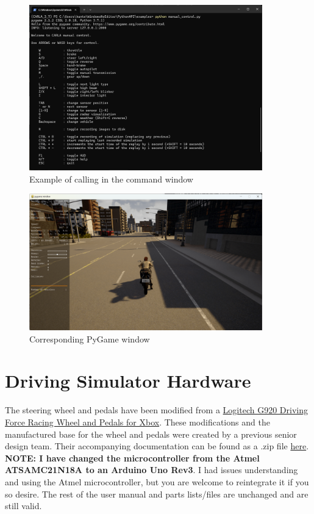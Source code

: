 \documentclass[12pt,oneside,letterpaper]{article}
\begin{document}
\begin{figure}[h]
\centering
\includegraphics[width=0.9\textwidth]{manual_control_cmd}
\caption{Example of calling  in the command window}
\label{fig:manual_control_cmd}
\end{figure}

\begin{figure}[h]
\centering
\includegraphics[width=0.9\textwidth]{manual_control_example}
\caption{Corresponding  PyGame window}
\label{fig:manual_control_example}
\end{figure}

\section{Driving Simulator Hardware}
The steering wheel and pedals have been modified from a \href{https://www.logitechg.com/en-sa/products/driving/driving-force-racing-wheel.941-000123.html}{Logitech G920 Driving Force Racing Wheel and Pedals for Xbox}.  These modifications and the manufactured base for the wheel and pedals were created by a previous senior design team. Their accompanying documentation can be found as a .zip file \href{https://alabama.box.com/s/ppm0j7ax0zvq7z98z6g3qv7kapbet37a}{here}. \textbf{NOTE: I have changed the microcontroller from the Atmel ATSAMC21N18A to an Arduino Uno Rev3}. I had issues understanding and using the Atmel microcontroller, but you are welcome to reintegrate it if you so desire. The rest of the user manual and parts lists/files are unchanged and are still valid. 
\end{document}
